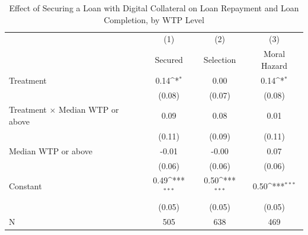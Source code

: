 \begin{table}[htbp]\centering
\def\sym#1{\ifmmode^{#1}\else\(^{#1}\)\fi}
\caption{Effect of Securing a Loan with Digital Collateral on Loan Repayment and Loan Completion, by WTP Level\label{LASMH\_complete\_wtpinteract\_LATE}}
\begin{tabular}{l*{3}{c}}
\toprule
                    &\multicolumn{1}{c}{(1)}&\multicolumn{1}{c}{(2)}&\multicolumn{1}{c}{(3)}\\
                    &\multicolumn{1}{c}{Secured}&\multicolumn{1}{c}{Selection}&\multicolumn{1}{c}{Moral Hazard}\\
\midrule
Treatment           &        0.14\sym{*}  &        0.00         &        0.14\sym{*}  \\
                    &      (0.08)         &      (0.07)         &      (0.08)         \\\addlinespace
Treatment $\times$ Median WTP or above&        0.09         &        0.08         &        0.01         \\
                    &      (0.11)         &      (0.09)         &      (0.11)         \\\addlinespace
Median WTP or above &       -0.01         &       -0.00         &        0.07         \\
                    &      (0.06)         &      (0.06)         &      (0.06)         \\\addlinespace
Constant            &        0.49\sym{***}&        0.50\sym{***}&        0.50\sym{***}\\
                    &      (0.05)         &      (0.05)         &      (0.05)         \\\addlinespace
\midrule
N                   &         505         &         638         &         469         \\
\bottomrule
\end{tabular}
\end{table}
